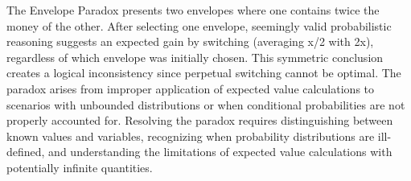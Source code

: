 The Envelope Paradox presents two envelopes where one contains twice the money of the other. After selecting one envelope, seemingly valid probabilistic reasoning suggests an expected gain by switching (averaging x/2 with 2x), regardless of which envelope was initially chosen. This symmetric conclusion creates a logical inconsistency since perpetual switching cannot be optimal. The paradox arises from improper application of expected value calculations to scenarios with unbounded distributions or when conditional probabilities are not properly accounted for. Resolving the paradox requires distinguishing between known values and variables, recognizing when probability distributions are ill-defined, and understanding the limitations of expected value calculations with potentially infinite quantities.
